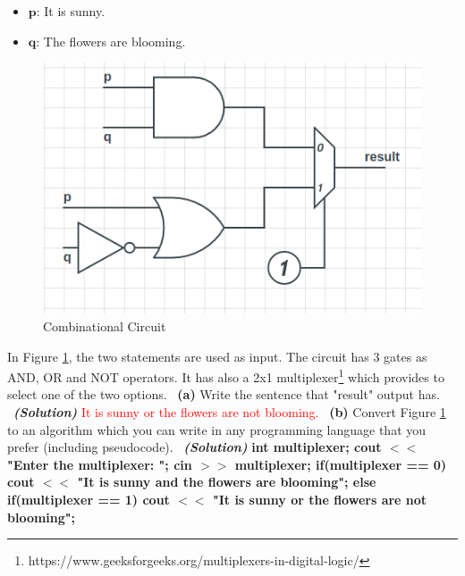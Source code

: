 \documentclass[a4 paper]{article}
\numberwithin{equation}{section}
\newcommand{\subproblem}[1]{~\newline\textbf{(#1)}}
\newcommand{\solution}{~\newline\textbf{\textit{(Solution)}} }
\newcommand{\0}{\mathbf{0}}
\begin{document}
\begin{itemize}
	\item $\textbf{p:}$ It is sunny.
	\item $\textbf{q:}$ The flowers are blooming.
\end{itemize}

\begin{figure}[htp]
	\centering
	\includegraphics[scale=0.5]{circuit.png}
	\caption{Combinational Circuit}
	\label{fig: circuit}
	
\end{figure}

In Figure \ref{fig: circuit}, the two statements are used as input. The circuit has 3 gates as AND, OR and NOT operators. It has also a 2x1 multiplexer\footnote{https://www.geeksforgeeks.org/multiplexers-in-digital-logic/} which provides to select one of the two options. 
\subproblem{a} Write the sentence that "result" output has.
\solution
\newline
\textcolor{red}{It is sunny or the flowers are not blooming.}
\newline
\newline
\subproblem{b} Convert Figure \ref{fig: circuit} to an algorithm which you can write in any programming language that you prefer (including pseudocode).
\solution
\newline
\textbf{int multiplexer; \newline
cout $<<$ "Enter the multiplexer: "; \newline
cin $>>$ multiplexer; \newline
if(multiplexer == 0) \newline
cout $<<$ "It is sunny and the flowers are blooming"; \newline
else if(multiplexer == 1) \newline
cout $<<$ "It is sunny or the flowers are not blooming"; \newline}
\newline
\newline
\end{document}
